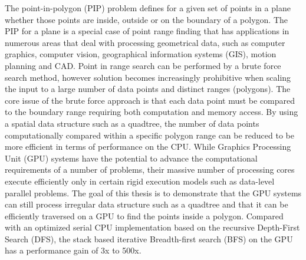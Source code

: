 %
%
%
%
%
%
The point-in-polygon (PIP) problem defines for a given set of points
in a plane whether those points are inside, outside or on the
boundary of a polygon. The PIP for a plane is a special case of point
range finding that has applications in numerous areas that deal with
processing geometrical data, such as computer graphics, computer
vision, geographical information systems (GIS), motion planning and
CAD. Point in range search can be performed by a brute force search
method, however solution becomes increasingly prohibitive when
scaling the input to a large number of data points and distinct
ranges (polygons). The core issue of the brute force approach is that
each data point must be compared to the boundary range requiring
both computation and memory access.  By using a spatial data structure
such as a quadtree, the number of data points computationally compared
within a specific polygon range can be reduced to be more efficient in
terms of performance on the CPU.  While Graphics Processing Unit (GPU) 
systems have the potential to advance the computational requirements
of a number of problems, their massive number of processing cores
execute efficiently only in certain rigid execution models such as
data-level parallel problems. The goal of this thesis is to demonstrate
that the GPU systems can still process irregular data structure such
as a quadtree and that it can be efficiently traversed on a GPU to find the points
inside a polygon. Compared with an optimized serial CPU implementation
based on the recursive Depth-First Search (DFS), the stack based
iterative Breadth-first search (BFS) on the GPU has a performance gain
of 3x to 500x.
\newpage

